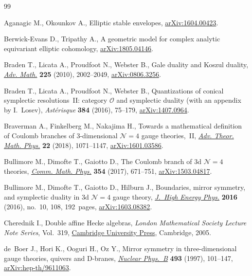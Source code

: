 \documentclass[10pt,a4paper]{amsart}
\numberwithin{equation}{section}
\begin{document}
\begin{thebibliography}{99}
\footnotesize\itemsep=0pt

Aganagic M., Okounkov A., Elliptic stable envelopes, \href{https://arxiv.org/abs/1604.00423}{arXiv:1604.00423}.

Berwick-Evans D., Tripathy A., A geometric model for complex analytic
 equivariant elliptic cohomology, \href{https://arxiv.org/abs/1805.04146}{arXiv:1805.04146}.

Braden T., Licata A., Proudfoot N., Webster B., Gale duality and {K}oszul
 duality, \href{https://doi.org/10.1016/j.aim.2010.04.011}{\textit{Adv. Math.}} \textbf{225} (2010), 2002--2049,
 \href{https://arxiv.org/abs/0806.3256}{arXiv:0806.3256}.

Braden T., Licata A., Proudfoot N., Webster B., Quantizations of conical
 symplectic resolutions~{II}: category {$\mathcal O$} and symplectic duality
 (with an appendix by {I}.~{L}osev), \textit{Ast\'{e}risque} \textbf{384}
 (2016), 75--179, \href{https://arxiv.org/abs/1407.0964}{arXiv:1407.0964}.

Braverman A., Finkelberg M., Nakajima H., Towards a mathematical definition of
 {C}oulomb branches of 3-dimensional {${\mathcal N}=4$} gauge theories,~{II},
 \href{https://doi.org/10.4310/ATMP.2018.v22.n5.a1}{\textit{Adv. Theor. Math. Phys.}} \textbf{22} (2018), 1071--1147,
 \href{https://arxiv.org/abs/1601.03586}{arXiv:1601.03586}.

Bullimore M., Dimofte T., Gaiotto D., The {C}oulomb branch of 3d {${\mathcal
 N}=4$} theories, \href{https://doi.org/10.1007/s00220-017-2903-0}{\textit{Comm. Math. Phys.}} \textbf{354} (2017), 671--751,
 \href{https://arxiv.org/abs/1503.04817}{arXiv:1503.04817}.

Bullimore M., Dimofte T., Gaiotto D., Hilburn J., Boundaries, mirror symmetry,
 and symplectic duality in 3d {${\mathcal N}=4$} gauge theory, \href{https://doi.org/10.1007/JHEP10(2016)108}{\textit{J.~High
 Energy Phys.}} \textbf{2016} (2016), no.~10, 108, 192~pages,
 \href{https://arxiv.org/abs/1603.08382}{arXiv:1603.08382}.

Cherednik I., Double affine {H}ecke algebras, \textit{London Mathematical
 Society Lecture Note Series}, Vol.~319, \href{https://doi.org/10.1017/CBO9780511546501}{Cambridge University Press},
 Cambridge, 2005.

de~Boer J., Hori K., Ooguri H., Oz Y., Mirror symmetry in three-dimensional
 gauge theories, quivers and {D}-branes, \href{https://doi.org/10.1016/S0550-3213(97)00125-9}{\textit{Nuclear Phys.~B}} \textbf{493}
 (1997), 101--147, \href{https://arxiv.org/abs/hep-th/9611063}{arXiv:hep-th/9611063}.


\end{thebibliography}
\end{document}
